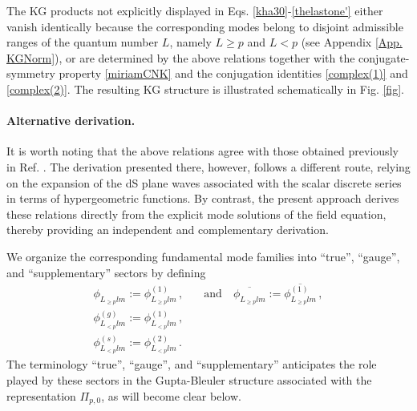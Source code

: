 \documentclass[aps,twocolumn,nofootinbib]{revtex4}
\begin{document}
The KG products not explicitly displayed in Eqs. \eqref{kha30}-\eqref{thelastone'} either vanish identically because the corresponding modes belong to disjoint admissible ranges of the quantum number $L$, namely $L\geqslant p$ and $L<p$ (see Appendix \ref{App. KGNorm}), or are determined by the above relations together with the conjugate-symmetry property \eqref{miriamCNK} and the conjugation identities \eqref{complex(1)} and \eqref{complex(2)}. The resulting KG structure is illustrated schematically in Fig. \ref{fig}.

\paragraph{Alternative derivation.} It is worth noting that the above relations agree with those obtained previously in Ref. \cite{Gazeau2010}. The derivation presented there, however, follows a different route, relying on the expansion of the dS plane waves associated with the scalar discrete series in terms of hypergeometric functions. By contrast, the present approach derives these relations directly from the explicit mode solutions of the field equation, thereby providing an independent and complementary derivation.

We organize the corresponding fundamental mode families into ``true'', ``gauge'', and ``supplementary'' sectors by defining
\begin{align}
    \phi^{}_{L^{}_{\geqslant p}lm} := \phi^{(1)}_{L^{}_{\geqslant p}lm} \,, & \quad\mbox{and}\quad \overline{\phi^{}_{L^{}_{\geqslant p}lm}} := \overline{\phi^{(1)}_{L^{}_{\geqslant p}lm}} \,, \label{true>=p} \\[3pt]
    \phi^{(g)}_{L_{<p}^{}lm} := \phi^{(1)}_{L_{<p}^{}lm} \,, \label{gauge} & \\[3pt]
    \phi^{(s)}_{L_{<p}^{}lm} := \phi^{(2)}_{L_{<p}^{}lm}\,. & \label{supp} 
\end{align}
The terminology ``true'', ``gauge'', and ``supplementary'' anticipates the role played by these sectors in the Gupta-Bleuler structure associated with the representation $\Pi_{p,0}$, as will become clear below.
\end{document}
